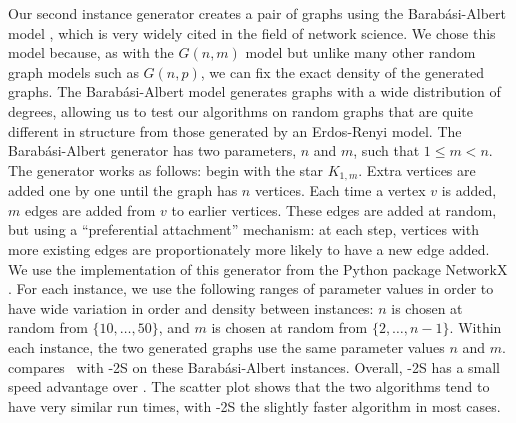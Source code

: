 Our second instance generator creates a pair of graphs using the Barabási-Albert model \cite{barabasi1999emergence},
which is very widely cited in the field of network science.
We chose this model because, as with the $G(n,m)$ model but unlike many other random graph models such
as $G(n,p)$, we can fix the exact density of the generated graphs.
The Barabási-Albert model generates graphs with a wide distribution of degrees, allowing us to test
our algorithms on random graphs that are quite different in structure from those generated by
an Erdos-Renyi model.
The Barabási-Albert generator has two parameters, $n$ and $m$, such that
$1 \leq m < n$.  The generator works as follows: begin with the star $K_{1,m}$.
Extra vertices are added one by one until the graph has $n$ vertices.  Each time a vertex $v$ is added,
$m$ edges are added from $v$ to earlier vertices.  These edges are added at random, but using a ``preferential
attachment'' mechanism: at each step, vertices with more existing edges are proportionately more likely to have a new edge
added.  We use the implementation of this generator from the Python package NetworkX \cite{networkx}.
For each instance, we use the following ranges of parameter values in order to
have wide variation in order and density between instances: $n$ is chosen at random
from $\{10,\dots,50\}$, and $m$ is chosen at random from $\{2,\dots,n-1\}$.  Within each instance, the two
generated graphs use the same parameter values $n$ and $m$.
 compares \McSplit\ with \McSplit-2S on these Barabási-Albert instances.
Overall, \McSplit-2S has a small speed advantage over \McSplit.  The scatter plot shows that the two algorithms
tend to have very similar run times, with \McSplit-2S the slightly faster algorithm in most cases.

